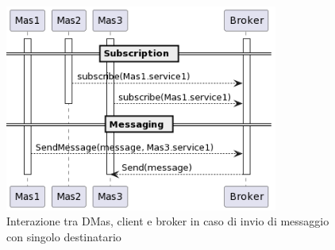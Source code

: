 \begin{figure}[ht!]
    \centering
    \includegraphics[width=0.8\textwidth]{figures/interaction-sendmessage.png}
    \caption{Interazione tra DMas, client e broker in caso di invio di messaggio con singolo destinatario}
    \label{fig:interaction-sendmessage}
\end{figure}
